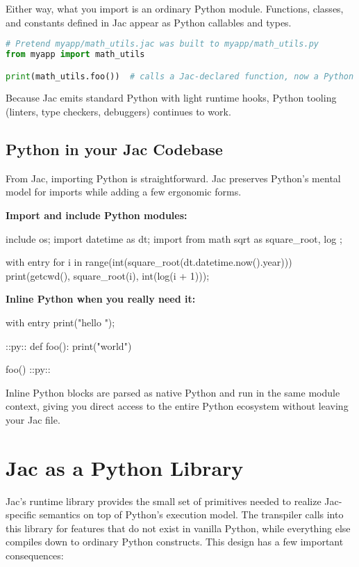 Either way, what you import is an ordinary Python module. Functions, classes, and constants defined in Jac appear as Python callables and types.

\begin{lstlisting}[language=Python]
# Pretend myapp/math_utils.jac was built to myapp/math_utils.py
from myapp import math_utils

print(math_utils.foo())  # calls a Jac-declared function, now a Python def
\end{lstlisting}

Because Jac emits standard Python with light runtime hooks, Python tooling (linters, type checkers, debuggers) continues to work.

\subsection{Python in your Jac Codebase}
From Jac, importing Python is straightforward. Jac preserves Python's mental model for imports while adding a few ergonomic forms.

\textbf{Import and include Python modules:}

\begin{jacblock}
include os;
import datetime as dt;
import from math { sqrt as square_root, log };

with entry {
    for i in range(int(square_root(dt.datetime.now().year))) {
        print(getcwd(), square_root(i), int(log(i + 1)));
    }
}
\end{jacblock}

\textbf{Inline Python when you really need it:}

\begin{jacblock}
with entry { print("hello "); }

::py::
def foo():
    print("world")

foo()
::py::
\end{jacblock}

Inline Python blocks are parsed as native Python and run in the same module context, giving you direct access to the entire Python ecosystem without leaving your Jac file.

\section{Jac as a Python Library}
Jac's runtime library provides the small set of primitives needed to realize Jac-specific semantics on top of Python's execution model. The transpiler calls into this library for features that do not exist in vanilla Python, while everything else compiles down to ordinary Python constructs. This design has a few important consequences:

